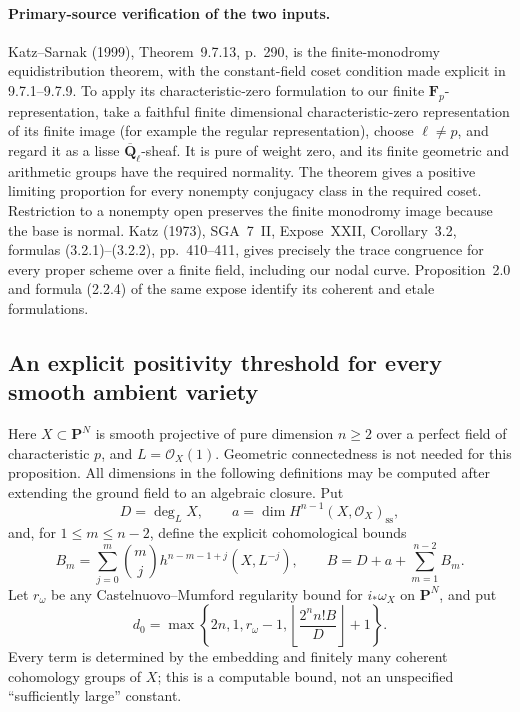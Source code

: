 \paragraph{Primary-source verification of the two inputs.}
Katz--Sarnak (1999), Theorem~9.7.13, p.~290, is the finite-monodromy
equidistribution theorem, with the constant-field coset condition made
explicit in 9.7.1--9.7.9.  To apply its characteristic-zero formulation
to our finite $\mathbf F_p$-representation, take a faithful finite
dimensional characteristic-zero representation of its finite image
(for example the regular representation), choose $\ell\ne p$, and
regard it as a lisse $\overline{\mathbf Q}_\ell$-sheaf.  It is pure of
weight zero, and its finite geometric and arithmetic groups have the
required normality.  The theorem gives a positive limiting proportion
for every nonempty conjugacy class in the required coset.  Restriction
to a nonempty open preserves the finite monodromy image because the
base is normal.  Katz (1973), SGA~7~II, Expose~XXII, Corollary~3.2,
formulas (3.2.1)--(3.2.2), pp.~410--411, gives precisely the trace
congruence for every proper scheme over a finite field, including
our nodal curve.  Proposition~2.0 and formula (2.2.4) of the same
expose identify its coherent and etale formulations.

\subsection{An explicit positivity threshold for every smooth ambient variety}
\label{subsec:explicit-positivity}

Here $X\subset\mathbf P^N$ is smooth projective of pure dimension
$n\geq2$ over a perfect field of characteristic $p$, and $L=\mathcal O_X(1)$.
Geometric connectedness is not needed for this proposition.  All
dimensions in the following definitions may be computed after extending
the ground field to an algebraic closure.  Put
\[
 D=\deg_L X,\qquad
 a=\dim H^{n-1}(X,\mathcal O_X)_{\mathrm{ss}},
\]
and, for $1\leq m\leq n-2$, define the explicit cohomological bounds
\[
 B_m=\sum_{j=0}^{m}\binom mj
       h^{n-m-1+j}(X,L^{-j}),\qquad
 B=D+a+\sum_{m=1}^{n-2}B_m.
\]
Let $r_\omega$ be any Castelnuovo--Mumford regularity bound for
$i_*\omega_X$ on $\mathbf P^N$, and put
\begin{equation}\label{eq:explicit-d0}
 d_0=\max\left\{2n,1,r_\omega-1,
       \left\lfloor\frac{2^n n!B}{D}\right\rfloor+1\right\}.
\end{equation}
Every term is determined by the embedding and finitely many coherent
cohomology groups of $X$; this is a computable bound, not an unspecified
``sufficiently large'' constant.

